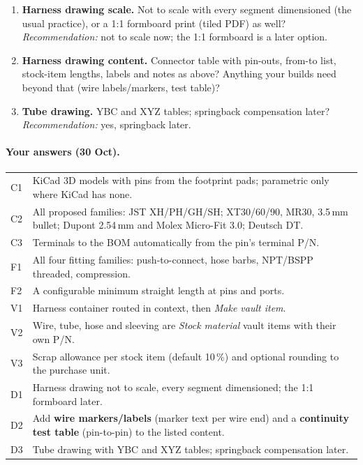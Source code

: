 \begin{enumerate}[label=D\arabic*.]
  \item \textbf{Harness drawing scale.} Not to scale with every segment dimensioned (the usual practice), or
        a 1:1 formboard print (tiled PDF) as well? \emph{Recommendation:} not to scale now; the 1:1 formboard
        is a later option.
  \item \textbf{Harness drawing content.} Connector table with pin-outs, from-to list, stock-item lengths,
        labels and notes as above? Anything your builds need beyond that (wire labels/markers, test table)?
  \item \textbf{Tube drawing.} YBC and XYZ tables; springback compensation later?
        \emph{Recommendation:} yes, springback later.
\end{enumerate}

\paragraph{Your answers (30 Oct).}
\begin{center}
\small
\begin{tabularx}{\linewidth}{@{}lX@{}}
\toprule
C1 & KiCad 3D models with pins from the footprint pads; parametric only where KiCad has none.\\
C2 & All proposed families: JST XH/PH/GH/SH; XT30/60/90, MR30, 3.5\,mm bullet; Dupont 2.54\,mm and Molex
     Micro-Fit 3.0; Deutsch DT.\\
C3 & Terminals to the BOM automatically from the pin's terminal P/N.\\
F1 & All four fitting families: push-to-connect, hose barbs, NPT/BSPP threaded, compression.\\
F2 & A configurable minimum straight length at pins and ports.\\
V1 & Harness container routed in context, then \emph{Make vault item}.\\
V2 & Wire, tube, hose and sleeving are \emph{Stock material} vault items with their own P/N.\\
V3 & Scrap allowance per stock item (default 10\,\%) and optional rounding to the purchase unit.\\
D1 & Harness drawing not to scale, every segment dimensioned; the 1:1 formboard later.\\
D2 & Add \textbf{wire markers/labels} (marker text per wire end) and a \textbf{continuity test table}
     (pin-to-pin) to the listed content.\\
D3 & Tube drawing with YBC and XYZ tables; springback compensation later.\\
\bottomrule
\end{tabularx}
\end{center}

